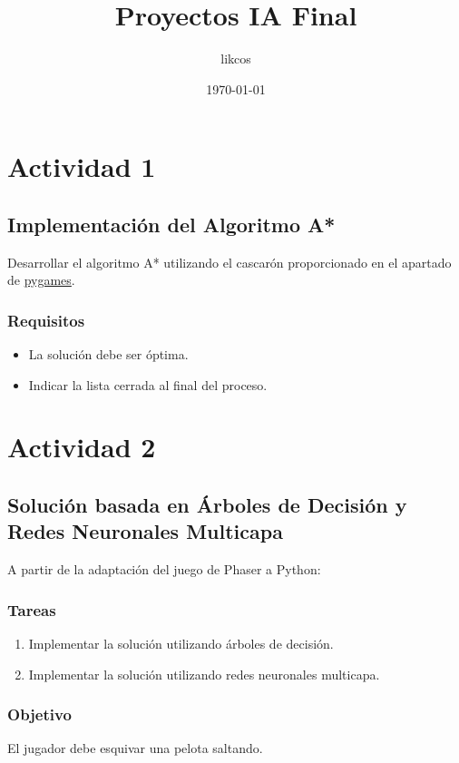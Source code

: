 \documentclass[11pt]{article}
\author{likcos}
\date{\today}
\title{Proyectos IA Final}
\begin{document}
\maketitle
\tableofcontents

\section*{Actividad 1}
\label{sec:orgb8278e5}
\subsection*{Implementación del Algoritmo A*}
\label{sec:org6234bb5}
Desarrollar el algoritmo A* utilizando el cascarón proporcionado en el apartado de \href{https://ealcaraz85.github.io/IA.io/\#org0d76d38}{pygames}. 

\subsubsection*{Requisitos}
\label{sec:org0844da0}
\begin{itemize}
\item La solución debe ser óptima.
\item Indicar la lista cerrada al final del proceso.
\end{itemize}

\section*{Actividad 2}
\label{sec:org0944a6b}
\subsection*{Solución basada en Árboles de Decisión y Redes Neuronales Multicapa}
\label{sec:orgf81b47b}
A partir de la adaptación del juego de Phaser a Python:

\subsubsection*{Tareas}
\label{sec:orgc9d3410}
\begin{enumerate}
\item Implementar la solución utilizando árboles de decisión.
\item Implementar la solución utilizando redes neuronales multicapa.
\end{enumerate}

\subsubsection*{Objetivo}
\label{sec:org88610ee}
El jugador debe esquivar una pelota saltando.
\end{document}

